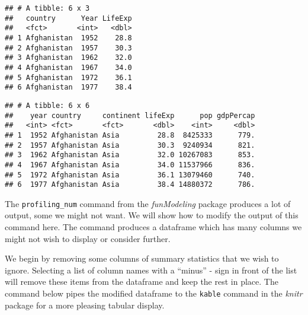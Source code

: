 \documentclass[]{book}
\newenvironment{Shaded}{\begin{snugshade}}{\end{snugshade}}
\newcommand{\KeywordTok}[1]{\textcolor[rgb]{0.13,0.29,0.53}{\textbf{#1}}}
\newcommand{\StringTok}[1]{\textcolor[rgb]{0.31,0.60,0.02}{#1}}
\newcommand{\CommentTok}[1]{\textcolor[rgb]{0.56,0.35,0.01}{\textit{#1}}}
\newcommand{\OperatorTok}[1]{\textcolor[rgb]{0.81,0.36,0.00}{\textbf{#1}}}
\newcommand{\NormalTok}[1]{#1}
\begin{document}
\begin{verbatim}
## # A tibble: 6 x 3
##   country      Year LifeExp
##   <fct>       <int>   <dbl>
## 1 Afghanistan  1952    28.8
## 2 Afghanistan  1957    30.3
## 3 Afghanistan  1962    32.0
## 4 Afghanistan  1967    34.0
## 5 Afghanistan  1972    36.1
## 6 Afghanistan  1977    38.4
\end{verbatim}

\begin{Shaded}
\end{Shaded}

\begin{verbatim}
## # A tibble: 6 x 6
##    year country     continent lifeExp      pop gdpPercap
##   <int> <fct>       <fct>       <dbl>    <int>     <dbl>
## 1  1952 Afghanistan Asia         28.8  8425333      779.
## 2  1957 Afghanistan Asia         30.3  9240934      821.
## 3  1962 Afghanistan Asia         32.0 10267083      853.
## 4  1967 Afghanistan Asia         34.0 11537966      836.
## 5  1972 Afghanistan Asia         36.1 13079460      740.
## 6  1977 Afghanistan Asia         38.4 14880372      786.
\end{verbatim}

The \texttt{profiling\_num} command from the \emph{funModeling} package
produces a lot of output, some we might not want. We will show how to
modify the output of this command here. The command produces a dataframe
which has many columns we might not wish to display or consider further.

We begin by removing some columns of summary statistics that we wish to
ignore. Selecting a list of column names with a ``minus'' - sign in
front of the list will remove these items from the dataframe and keep
the rest in place. The command below pipes the modified dataframe to the
\texttt{kable} command in the \emph{knitr} package for a more pleasing
tabular display.

\begin{Shaded}
\end{Shaded}
\end{document}
